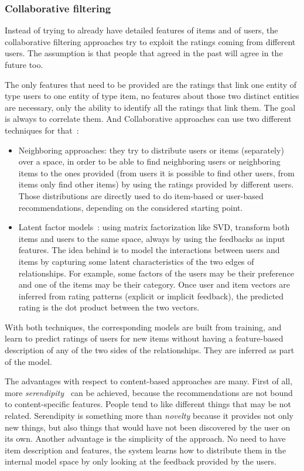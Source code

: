 \subsubsection{Collaborative filtering}
Instead of trying to already have detailed features of items and of users, the collaborative filtering approaches try to exploit the ratings coming from different users. The assumption is that people that agreed in the past will agree in the future too.

The only features that need to be provided are the ratings that link one entity of type users to one entity of type item, no features about those two distinct entities are necessary, only the ability to identify all the ratings that link them. The goal is always to correlate them. And Collaborative approaches can use two different techniques for that~\cite{koren2015advances}:

\begin{itemize}
	\item Neighboring approaches: they try to distribute users or items (separately) over a space, in order to be able to find neighboring users or neighboring items to the ones provided (from users it is possible to find other users, from items only find other items) by using the ratings provided by different users. Those distributions are directly used to do item-based or user-based recommendations, depending on the considered starting point.

	\item Latent factor models~\cite{koren2009matrix}: using matrix factorization like SVD, transform both items and users to the same space, always by using the feedbacks as input features. The idea behind is to model the interactions between users and items by capturing some latent characteristics of the two edges of relationships. For example, some factors of the users may be their preference and one of the items may be their category. Once user and item vectors are inferred from rating patterns (explicit or implicit feedback), the predicted rating is the dot product between the two vectors.
\end{itemize}

With both techniques, the corresponding models are built from training, and learn to predict ratings of users for new items without having a feature-based description of any of the two sides of the relationships. They are inferred as part of the model.

The advantages with respect to content-based approaches are many. First of all, more \textit{serendipity~\cite{roberts1989serendipity}} can be achieved, because the recommendations are not bound to content-specific features. People tend to like different things that may be not related. Serendipity is something more than \textit{novelty} because it provides not only new things, but also things that would have not been discovered by the user on its own. Another advantage is the simplicity of the approach. No need to have item description and features, the system learns how to distribute them in the internal model space by only looking at the feedback provided by the users.

